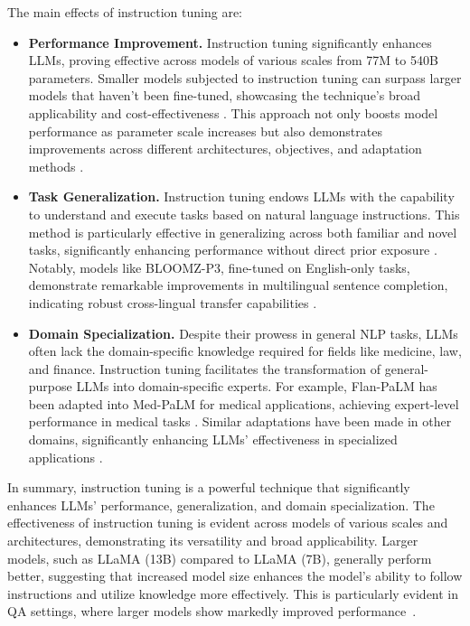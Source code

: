 The main effects of instruction tuning are:
\begin{itemize}
	\item \textbf{Performance Improvement.} {
		      Instruction tuning significantly enhances LLMs, proving effective across models of various scales from 77M to 540B parameters. Smaller models subjected to instruction tuning can surpass larger models that haven't been fine-tuned, showcasing the technique's broad applicability and cost-effectiveness \cite{tamkin2021understanding, wei2022fine}. This approach not only boosts model performance as parameter scale increases but also demonstrates improvements across different architectures, objectives, and adaptation methods \cite{raffel2023exploring}.
	      }
	\item \textbf{Task Generalization.} {
		      Instruction tuning endows LLMs with the capability to understand and execute tasks based on natural language instructions. This method is particularly effective in generalizing across both familiar and novel tasks, significantly enhancing performance without direct prior exposure \cite{chowdhery2022palm, tamkin2021understanding}. Notably, models like BLOOMZ-P3, fine-tuned on English-only tasks, demonstrate remarkable improvements in multilingual sentence completion, indicating robust cross-lingual transfer capabilities \cite{chowdhery2022palm}.
	      }
	\item \textbf{Domain Specialization.} {
		      Despite their prowess in general NLP tasks, LLMs often lack the domain-specific knowledge required for fields like medicine, law, and finance. Instruction tuning facilitates the transformation of general-purpose LLMs into domain-specific experts. For example, Flan-PaLM has been adapted into Med-PaLM for medical applications, achieving expert-level performance in medical tasks \cite{raffel2023exploring}. Similar adaptations have been made in other domains, significantly enhancing LLMs' effectiveness in specialized applications \cite{wei2022fine}.
	      }
\end{itemize}

In summary, instruction tuning is a powerful technique that significantly enhances LLMs' performance, generalization, and domain specialization. The effectiveness of instruction tuning is evident across models of various scales and architectures, demonstrating its versatility and broad applicability.
Larger models, such as LLaMA (13B) compared to LLaMA (7B), generally perform better, suggesting that increased model size enhances the model’s ability to follow instructions and utilize knowledge more effectively.
This is particularly evident in QA settings, where larger models show markedly improved performance~\cite{survey}.

